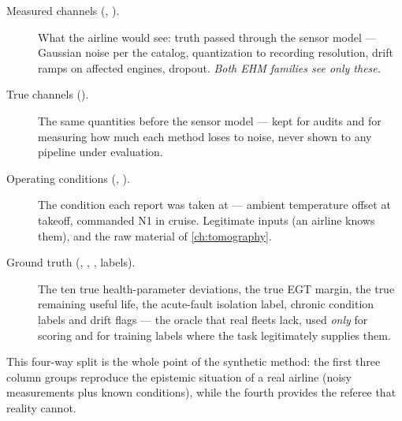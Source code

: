 \begin{description}
  \item[Measured channels (, ).] What the airline would see: truth
    passed through the sensor model --- Gaussian noise per the catalog, quantization to
    recording resolution, drift ramps on affected engines, dropout. \emph{Both EHM
    families see only these.}
  \item[True channels ().] The same quantities before the sensor model ---
    kept for audits and for measuring how much each method loses to noise, never shown
    to any pipeline under evaluation.
  \item[Operating conditions (, ).] The condition each
    report was taken at --- ambient temperature offset at takeoff, commanded N1 in
    cruise. Legitimate inputs (an airline knows them), and the raw material of
    \cref{ch:tomography}.
  \item[Ground truth (, , , labels).] The ten true
    health-parameter deviations, the true EGT margin, the true remaining useful life,
    the acute-fault isolation label, chronic condition labels and drift flags ---
    the oracle that real fleets lack, used \emph{only} for scoring and for training
    labels where the task legitimately supplies them.
\end{description}

This four-way split is the whole point of the synthetic method: the first three column
groups reproduce the epistemic situation of a real airline (noisy measurements plus known
conditions), while the fourth provides the referee that reality cannot.

